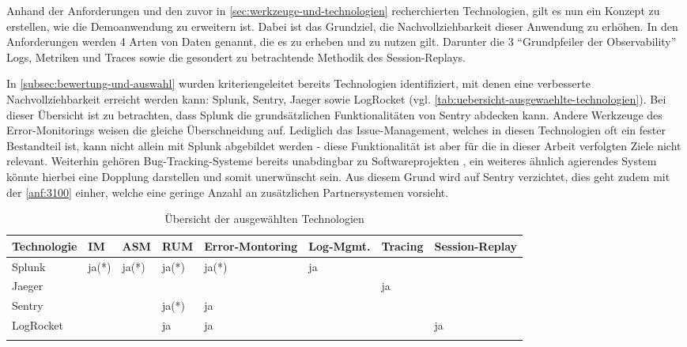% 

Anhand der Anforderungen und den zuvor in \autoref{sec:werkzeuge-und-technologien} recherchierten Technologien, gilt es nun ein Konzept zu erstellen, wie die Demoanwendung zu erweitern ist. Dabei ist das Grundziel, die Nachvollziehbarkeit dieser Anwendung zu erhöhen. In den Anforderungen werden 4 Arten von Daten genannt, die es zu erheben und zu nutzen gilt. Darunter die 3 \enquote{Grundpfeiler der Observability} Logs, Metriken und Traces sowie die gesondert zu betrachtende Methodik des Session-Replays.

In \autoref{subsec:bewertung-und-auswahl} wurden kriteriengeleitet bereits Technologien identifiziert, mit denen eine verbesserte Nachvollziehbarkeit erreicht werden kann: Splunk, Sentry, Jaeger sowie LogRocket (vgl. \autoref{tab:uebersicht-ausgewaehlte-technologien}). Bei dieser Übersicht ist zu betrachten, dass Splunk die grundsätzlichen Funktionalitäten von Sentry abdecken kann. Andere Werkzeuge des Error-Monitorings weisen die gleiche Überschneidung auf. Lediglich das Issue-Management, welches in diesen Technologien oft ein fester Bestandteil ist, kann nicht allein mit Splunk abgebildet werden - diese Funktionalität ist aber für die in dieser Arbeit verfolgten Ziele nicht relevant. Weiterhin gehören Bug-Tracking-Systeme bereits unabdingbar zu Softwareprojekten \cite{BugzillaITrackerAndOtherBugTrackers}, ein weiteres ähnlich agierendes System könnte hierbei eine Dopplung darstellen und somit unerwünscht sein. Aus diesem Grund wird auf Sentry verzichtet, dies geht zudem mit der \autoref{anf:3100} einher, welche eine geringe Anzahl an zusätzlichen Partnersystemen vorsieht.

\begingroup
\centering
\setlength{\LTleft}{-20cm plus -1fill}
\setlength{\LTright}{\LTleft}
\begin{longtable}{|p{4.10cm}|p{0.90cm}|p{0.90cm}|p{1.9cm}|p{1.75cm}|p{1.5cm}|p{1.4cm}|p{1.3cm}|}
\hline
Technologie & IM & ASM & RUM & Error-Montoring & Log-Mgmt. & Tracing & Session-Replay \\
\endhead
\hline
Splunk & ja(*) & ja(*) & ja(*) & ja(*) & ja &  &  \\
\hline
Jaeger &  &  &  &  &  & ja &  \\
\hline
Sentry &  &  & ja(*) & ja &  &  &  \\
\hline
LogRocket &  &  & ja & ja &  &  & ja \\
\hline
\caption{Übersicht der ausgewählten Technologien}
\label{tab:uebersicht-ausgewaehlte-technologien}
\end{longtable}
\endgroup

